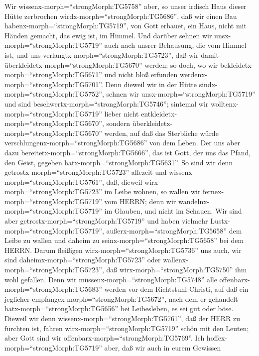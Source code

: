  Wir wissenx-morph=``strongMorph:TG5758'' aber, so unser
irdisch Haus dieser Hütte zerbrochen wirdx-morph=``strongMorph:TG5686'',
daß wir einen Bau habenx-morph=``strongMorph:TG5719'', von Gott erbauet,
ein Haus, nicht mit Händen gemacht, das ewig ist, im Himmel.
 Und darüber sehnen wir unsx-morph=``strongMorph:TG5719''
auch nach unsrer Behausung, die vom Himmel ist, und uns
verlangtx-morph=``strongMorph:TG5723'', daß wir damit
überkleidetx-morph=``strongMorph:TG5670'' werden;  so doch,
wo wir bekleidetx-morph=``strongMorph:TG5671'' und nicht bloß erfunden
werdenx-morph=``strongMorph:TG5701''.  Denn dieweil wir in
der Hütte sindx-morph=``strongMorph:TG5752'', sehnen wir
unsx-morph=``strongMorph:TG5719'' und sind
beschwertx-morph=``strongMorph:TG5746''; sintemal wir
wolltenx-morph=``strongMorph:TG5719'' lieber nicht
entkleidetx-morph=``strongMorph:TG5670'', sondern
überkleidetx-morph=``strongMorph:TG5670'' werden, auf daß das Sterbliche
würde verschlungenx-morph=``strongMorph:TG5686'' von dem Leben.
 Der uns aber dazu bereitetx-morph=``strongMorph:TG5666'',
das ist Gott, der uns das Pfand, den Geist, gegeben
hatx-morph=``strongMorph:TG5631''.  So sind wir denn
getrostx-morph=``strongMorph:TG5723'' allezeit und
wissenx-morph=``strongMorph:TG5761'', daß, dieweil
wirx-morph=``strongMorph:TG5723'' im Leibe wohnen, so wallen wir
fernex-morph=``strongMorph:TG5719'' vom HERRN;  denn wir
wandelnx-morph=``strongMorph:TG5719'' im Glauben, und nicht im Schauen.
 Wir sind aber getrostx-morph=``strongMorph:TG5719'' und
haben vielmehr Lustx-morph=``strongMorph:TG5719'',
außerx-morph=``strongMorph:TG5658'' dem Leibe zu wallen und daheim zu
seinx-morph=``strongMorph:TG5658'' bei dem HERRN.  Darum
fleißigen wirx-morph=``strongMorph:TG5736'' uns auch, wir sind
daheimx-morph=``strongMorph:TG5723'' oder
wallenx-morph=``strongMorph:TG5723'', daß
wirx-morph=``strongMorph:TG5750'' ihm wohl gefallen.  Denn
wir müssenx-morph=``strongMorph:TG5748'' alle
offenbarx-morph=``strongMorph:TG5683'' werden vor dem Richtstuhl
Christi, auf daß ein jeglicher empfangex-morph=``strongMorph:TG5672'',
nach dem er gehandelt hatx-morph=``strongMorph:TG5656'' bei Leibesleben,
es sei gut oder böse.  Dieweil wir denn
wissenx-morph=``strongMorph:TG5761'', daß der HERR zu fürchten ist,
fahren wirx-morph=``strongMorph:TG5719'' schön mit den Leuten; aber Gott
sind wir offenbarx-morph=``strongMorph:TG5769''. Ich
hoffex-morph=``strongMorph:TG5719'' aber, daß wir auch in eurem Gewissen

